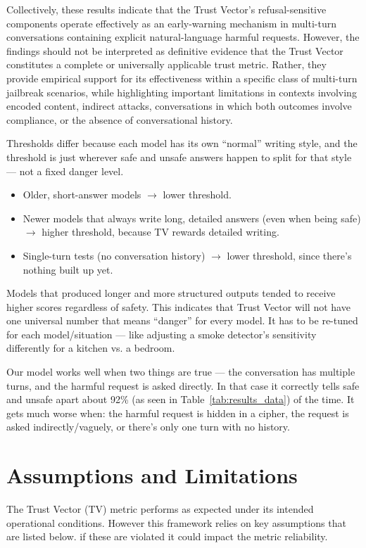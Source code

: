 \documentclass[conference]{IEEEtran}
\begin{document}
Collectively, these results indicate that the Trust Vector's refusal-sensitive components operate effectively as an early-warning mechanism in multi-turn conversations containing explicit natural-language harmful requests. However, the findings should not be interpreted as definitive evidence that the Trust Vector constitutes a complete or universally applicable trust metric. Rather, they provide empirical support for its effectiveness within a specific class of multi-turn jailbreak scenarios, while highlighting important limitations in contexts involving encoded content, indirect attacks, conversations in which both outcomes involve compliance, or the absence of conversational history.



Thresholds differ because each model has its own ``normal'' writing style, and the threshold is just wherever safe and unsafe answers happen to split for that style — not a fixed danger level. 
\begin{itemize}
    \item Older, short-answer models $\rightarrow$ lower threshold. 
    \item Newer models that always write long, detailed answers (even when being safe) $\rightarrow$ higher threshold, because TV rewards detailed writing.
    \item Single-turn tests (no conversation history) $\rightarrow$ lower threshold, since there's nothing built up yet.
\end{itemize}

Models that produced longer and more structured outputs tended to receive higher scores regardless of safety. This indicates that Trust Vector will not have one universal number that means ``danger'' for every model. It has to be re-tuned for each model/situation — like adjusting a smoke detector's sensitivity differently for a kitchen vs. a bedroom.

Our model works well when two things are true — the conversation has multiple turns, and the harmful request is asked directly. In that case it correctly tells safe and unsafe apart about 92\% (as seen in Table~\ref{tab:results_data}) of the time. It gets much worse when: the harmful request is hidden in a cipher, the request is asked indirectly/vaguely, or there's only one turn with no history. 

\section{Assumptions and Limitations}
The Trust Vector (TV) metric performs as expected under its intended operational conditions. However this framework relies on key assumptions that are listed below. if these are violated it could impact the metric reliability. 
\end{document}

